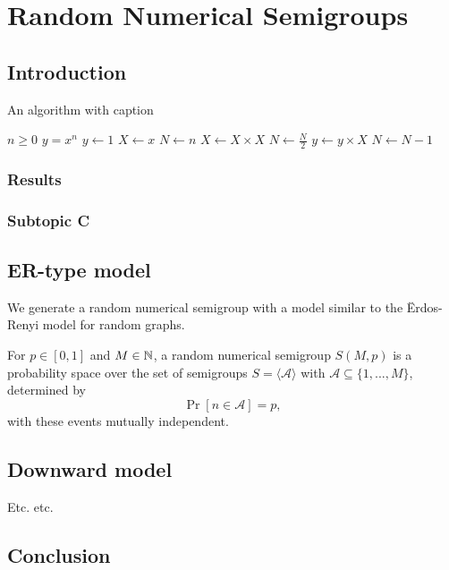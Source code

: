 
\chapter{Random Numerical Semigroups}\label{chap:contrib1}

\section{Introduction}\label{sec:randomsmpgs:intro}

\begin{algorithm}
\caption{An algorithm with caption}\label{alg:cap}
\begin{algorithmic}
\Require $n \geq 0$
\Ensure $y = x^n$
\State $y \gets 1$
\State $X \gets x$
\State $N \gets n$
    \State $X \gets X \times X$
    \State $N \gets \frac{N}{2}$  
    \State $y \gets y \times X$
    \State $N \gets N - 1$
\EndIf
\EndWhile
\end{algorithmic}
\end{algorithm}

\subsection{Results}\label{sec:contrib1:theme1:B}

\subsection{Subtopic C}\label{sec:contrib1:theme1:C}

\section{ER-type model}

We generate a random numerical semigroup with a model similar to the Ërdos-Renyi model for random graphs. 

\begin{definition}
    For $p \in [0, 1]$ and $M \in \mathbb{N}$, a random numerical semigroup $S(M, p)$ is a probability space over the set of semigroups $S = \langle\mathcal{A}\rangle$ with $\mathcal{A} \subseteq \{1,...,M\}$, determined by
    \[\Pr[n \in \mathcal{A}] = p,\]
    with these events mutually independent.
\end{definition}

\section{Downward model}\label{sec:contrib1:theme2}

Etc. etc.



\section{Conclusion}
